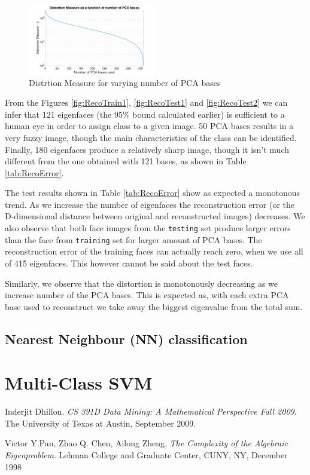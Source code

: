 \documentclass[10pt,twocolumn,letterpaper]{article}
\begin{document}
\begin{figure}[H]
\begin{center}
  
    \includegraphics[width=0.5\textwidth]{../results/DistMeasure}

  \caption{Distrtion Measure for varying number of PCA bases \label{fig:DistMeasure}}

\end{center}
\end{figure}
From the Figures \ref{fig:RecoTrain1},  \ref{fig:RecoTest1} and \ref{fig:RecoTest2} we can infer that 121 eigenfaces (the 95\% bound calculated earlier) is sufficient to a human eye in order to assign class to a given image. 50 PCA bases results in a very fuzzy image, though the main characteristics of the class can be identified. Finally, 180 eigenfaces produce a relatively sharp image, though it isn't much different from the one obtained with 121 bases, as shown in Table \ref{tab:RecoError}.

The test results shown in Table \ref{tab:RecoError} show as expected a monotonous trend. As we increase the number of eigenfaces the reconstruction error (or the D-dimensional distance between original and reconstructed images) decreases. We also observe that both face images from the {\tt\small testing} set produce larger errors than the face from {\tt\small training} set for larger amount of PCA bases. The reconstruction error of the training faces can actually reach zero, when we use all of 415 eigenfaces. This however cannot be said about the test faces.

Similarly, we observe that the distortion is monotonously decreasing as we increase number of the PCA bases. This is expected as, with each extra PCA base used to reconstruct we take away the biggest eigenvalue from the total sum.

\subsection{Nearest Neighbour (NN) classification}

\section{Multi-Class SVM}

{\small


}

\begin{thebibliography}{9}
Inderjit Dhillon. 
\textit{CS 391D Data Mining: A Mathematical Perspective Fall 2009}. 
The University of Texas at Austin, September 2009.

Victor Y.Pan, Zhao Q. Chen, Ailong Zheng. 
\textit{The Complexity of the Algebraic Eigenproblem}. 
Lehman College and Graduate Center, CUNY, NY, December 1998
\end{thebibliography}
\end{document}
